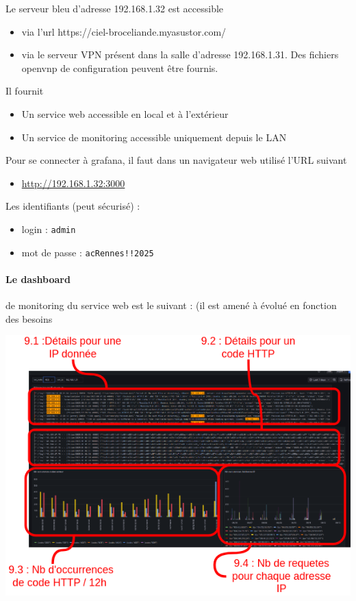 \documentclass[french, 12pt]{article}%
\newcommand{\itemE}{\item[$\bullet$]}
\begin{document}
Le serveur bleu d'adresse 192.168.1.32 est accessible 
\begin{itemize}
\itemE via l'url https://ciel-broceliande.myasustor.com/
\itemE via le serveur VPN présent dans la salle d'adresse 192.168.1.31. Des fichiers openvnp de configuration peuvent être fournis.
\end{itemize}
Il fournit 
\begin{itemize}
\itemE Un service web accessible en local et à l'extérieur 
\itemE Un service de monitoring accessible uniquement depuis le LAN
\end{itemize}

\vspace{0.5cm}
Pour se connecter à grafana, il faut dans un navigateur web utilisé l'URL suivant  
\begin{itemize}
\itemE \url{http://192.168.1.32:3000}
\end{itemize}


\vspace{0.5cm}
Les identifiants (peut sécurisé) : 
\begin{itemize}
\itemE login : \verb?admin?
\itemE mot de passe : \verb?acRennes!!2025?
\end{itemize}

\paragraph{Le dashboard} de monitoring du service web est le suivant : (il est amené à évolué en fonction des besoins

\begin{center}
\includegraphics[scale=0.7]{./ressource/exempleRelle.drawio.png}
\end{center}
\end{document}
